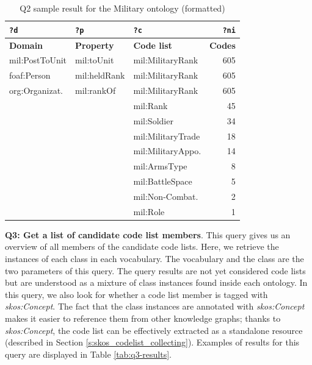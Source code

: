 \begin{table}[ht]
\footnotesize
\centering
\begin{tabular}{|l|l|l|r|}
\hline
\textbf{\texttt{?d}}      & \textbf{\texttt{?p}} & \textbf{\texttt{?c}} & \textbf{\texttt{?ni}} \\ \hline
\hline
\textbf{Domain}  & \textbf{Property} & \textbf{Code list} & \textbf{Codes} \\ \hline
mil:PostToUnit   & mil:toUnit        & mil:MilitaryRank           & 605              \\ \hline
foaf:Person      & mil:heldRank      & mil:MilitaryRank           & 605              \\ \hline
org:Organizat.   & mil:rankOf        & mil:MilitaryRank           & 605              \\ \hline
                 &                   & mil:Rank                   & 45               \\ \hline
                 &                   & mil:Soldier                & 34               \\ \hline
                 &                   & mil:MilitaryTrade          & 18               \\ \hline
                 &                   & mil:MilitaryAppo.          & 14               \\ \hline
                 &                   & mil:ArmsType               & 8                \\ \hline
                 &                   & mil:BattleSpace            & 5                \\ \hline
                 &                   & mil:Non-Combat.            & 2                \\ \hline
                 &                   & mil:Role                   & 1                \\ \hline
\end{tabular}
\caption{Q2 sample result for the Military ontology (formatted)} \label{tab:q2-results}
\end{table}

\medskip
\medskip
\medskip
\noindent\textbf{Q3: Get a list of candidate code list members}. This query gives us an overview of all members of the candidate code lists. Here, we retrieve the instances %
of each class in each vocabulary. The vocabulary and the class are the two parameters of this query. The query results are not yet considered code lists but are understood as a mixture of class instances found inside each ontology. In this query, we also look for whether a code list member is tagged with \emph{skos:Concept}. The fact that the class instances are annotated with \emph{skos:Concept} makes it easier to reference them from other knowledge graphs; thanks to \emph{skos:Concept}, the code list can be effectively extracted as a standalone resource (described in Section \ref{s:skos_codelist_collecting}). Examples of results for this query are displayed in Table \ref{tab:q3-results}.

